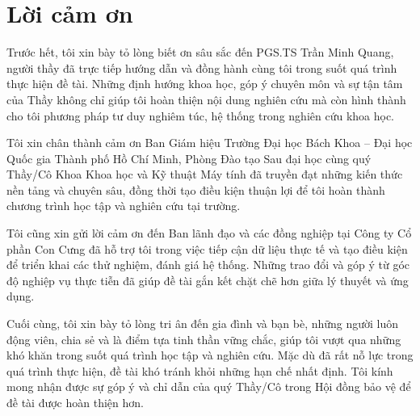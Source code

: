 \chapter*{Lời cảm ơn}
Trước hết, tôi xin bày tỏ lòng biết ơn sâu sắc đến PGS.TS Trần Minh Quang, người thầy đã trực tiếp hướng dẫn và đồng hành cùng tôi trong suốt quá trình thực hiện đề tài. Những định hướng khoa học, góp ý chuyên môn và sự tận tâm của Thầy không chỉ giúp tôi hoàn thiện nội dung nghiên cứu mà còn hình thành cho tôi phương pháp tư duy nghiêm túc, hệ thống trong nghiên cứu khoa học.

Tôi xin chân thành cảm ơn Ban Giám hiệu Trường Đại học Bách Khoa – Đại học Quốc gia Thành phố Hồ Chí Minh, Phòng Đào tạo Sau đại học cùng quý Thầy/Cô Khoa Khoa học và Kỹ thuật Máy tính đã truyền đạt những kiến thức nền tảng và chuyên sâu, đồng thời tạo điều kiện thuận lợi để tôi hoàn thành chương trình học tập và nghiên cứu tại trường.

Tôi cũng xin gửi lời cảm ơn đến Ban lãnh đạo và các đồng nghiệp tại Công ty Cổ phần Con Cưng đã hỗ trợ tôi trong việc tiếp cận dữ liệu thực tế và tạo điều kiện để triển khai các thử nghiệm, đánh giá hệ thống. Những trao đổi và góp ý từ góc độ nghiệp vụ thực tiễn đã giúp đề tài gắn kết chặt chẽ hơn giữa lý thuyết và ứng dụng.

Cuối cùng, tôi xin bày tỏ lòng tri ân đến gia đình và bạn bè, những người luôn động viên, chia sẻ và là điểm tựa tinh thần vững chắc, giúp tôi vượt qua những khó khăn trong suốt quá trình học tập và nghiên cứu.
Mặc dù đã rất nỗ lực trong quá trình thực hiện, đề tài khó tránh khỏi những hạn chế nhất định. Tôi kính mong nhận được sự góp ý và chỉ dẫn của quý Thầy/Cô trong Hội đồng bảo vệ để đề tài được hoàn thiện hơn.
